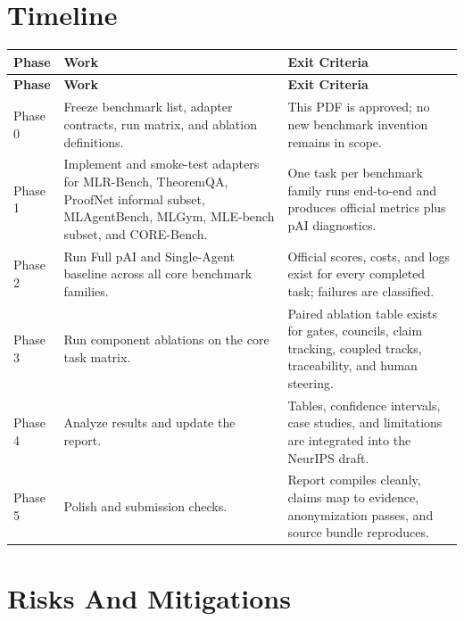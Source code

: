 \documentclass[11pt]{article}
\newcommand{\pai}{pAI}
\begin{document}
\section*{Timeline}

\begin{longtable}{>{\raggedright\arraybackslash}p{} >{\raggedright\arraybackslash}p{} >{\raggedright\arraybackslash}p{}}
\toprule
\textbf{Phase} & \textbf{Work} & \textbf{Exit Criteria} \\
\midrule
\endfirsthead
\toprule
\textbf{Phase} & \textbf{Work} & \textbf{Exit Criteria} \\
\midrule
\endhead
Phase 0 & Freeze benchmark list, adapter contracts, run matrix, and ablation definitions. & This PDF is approved; no new benchmark invention remains in scope. \\
Phase 1 & Implement and smoke-test adapters for MLR-Bench, TheoremQA, ProofNet informal subset, MLAgentBench, MLGym, MLE-bench subset, and CORE-Bench. & One task per benchmark family runs end-to-end and produces official metrics plus \pai{} diagnostics. \\
Phase 2 & Run Full \pai{} and Single-Agent baseline across all core benchmark families. & Official scores, costs, and logs exist for every completed task; failures are classified. \\
Phase 3 & Run component ablations on the core task matrix. & Paired ablation table exists for gates, councils, claim tracking, coupled tracks, traceability, and human steering. \\
Phase 4 & Analyze results and update the report. & Tables, confidence intervals, case studies, and limitations are integrated into the NeurIPS draft. \\
Phase 5 & Polish and submission checks. & Report compiles cleanly, claims map to evidence, anonymization passes, and source bundle reproduces. \\
\bottomrule
\end{longtable}

\section*{Risks And Mitigations}
\end{document}
